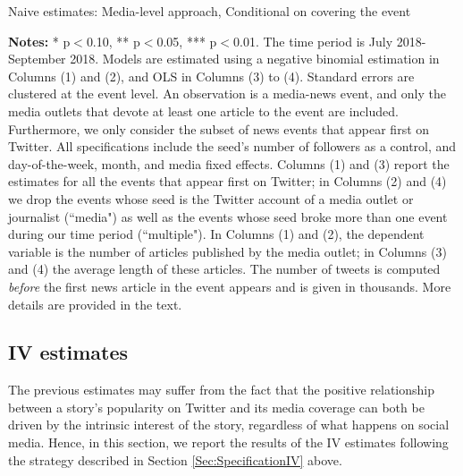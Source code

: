 \begin{table}
\caption{Naive estimates: Media-level approach, Conditional on covering the event}
\begin{center}
	
\end{center}
\begin{spacing}{0.5}
	{\fns \textbf{Notes:} * p$<$0.10, ** p$<$0.05, *** p$<$0.01. The time period is July 2018-September 2018.  Models are estimated using a negative binomial estimation in Columns (1) and (2), and OLS in Columns (3) to (4). Standard errors are clustered at the event level. An observation is a media-news event, and only the media outlets that devote at least one article to the event are included. Furthermore, we only consider the subset of news events that appear first on Twitter. All specifications include the seed's number of followers as a control, and day-of-the-week, month, and media fixed effects. Columns (1) and (3) report the estimates for all the events that appear first on Twitter; in Columns (2) and (4) we drop the events whose seed is the Twitter account of a media outlet or journalist (``media") as well as the events whose seed broke more than one event during our time period (``multiple"). In Columns (1) and (2), the dependent variable is the number of articles published by the media outlet; in Columns (3) and (4) the average length of these articles. The number of tweets is computed \textit{before} the first news article in the event appears and is given in thousands. More details are provided in the text.}
\end{spacing}
\label{Tab:number_articles_negbinomial_Dcover_cevent}
\end{table} 



\subsection{IV estimates\label{Sec:ResultsIV}}

The previous estimates may suffer from the fact that the positive relationship between a story's popularity on Twitter and its media coverage can both be driven by the intrinsic interest of the story, regardless of what happens on social media. Hence, in this section, we report the results of the IV estimates following the strategy described in Section \ref{Sec:SpecificationIV} above.

